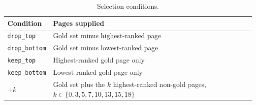 \begin{table}[t]
\centering
\small
\setlength{\tabcolsep}{4pt}
\renewcommand{\arraystretch}{1.15}
\begin{tabular}{@{}
  >{\raggedright\arraybackslash}p{}
  >{\raggedright\arraybackslash}p{}@{}}
\toprule
\textbf{Condition} & \textbf{Pages supplied} \\
\midrule
\texttt{drop\_top}    & Gold set minus highest-ranked page \\
\texttt{drop\_bottom} & Gold set minus lowest-ranked page \\
\texttt{keep\_top}    & Highest-ranked gold page only \\
\texttt{keep\_bottom} & Lowest-ranked gold page only \\
$+k$                  & Gold set plus the $k$ highest-ranked non-gold pages, $k \in \{0,3,5,7,10,13,15,18\}$ \\
\bottomrule
\end{tabular}
\caption{Selection conditions.}
\label{tab:app_selection}
\end{table}